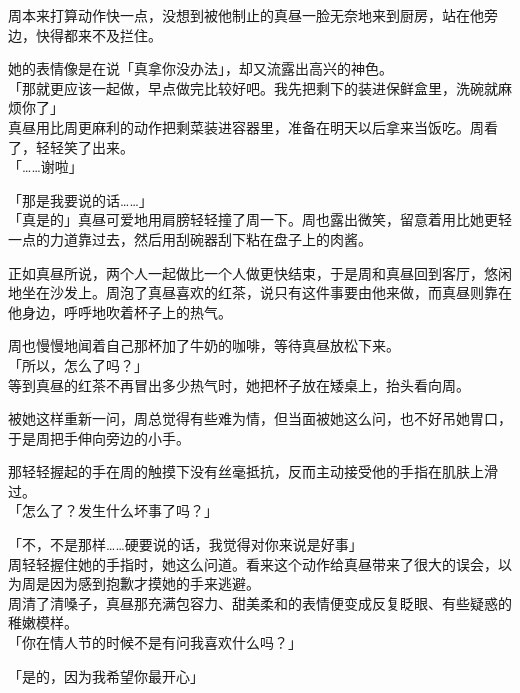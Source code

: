 周本来打算动作快一点，没想到被他制止的真昼一脸无奈地来到厨房，站在他旁边，快得都来不及拦住。

她的表情像是在说「真拿你没办法」，却又流露出高兴的神色。\\

「那就更应该一起做，早点做完比较好吧。我先把剩下的装进保鲜盒里，洗碗就麻烦你了」\\

真昼用比周更麻利的动作把剩菜装进容器里，准备在明天以后拿来当饭吃。周看了，轻轻笑了出来。\\

「……谢啦」

「那是我要说的话……」\\

「真是的」真昼可爱地用肩膀轻轻撞了周一下。周也露出微笑，留意着用比她更轻一点的力道靠过去，然后用刮碗器刮下粘在盘子上的肉酱。\\

\vspace{2\baselineskip}

正如真昼所说，两个人一起做比一个人做更快结束，于是周和真昼回到客厅，悠闲地坐在沙发上。周泡了真昼喜欢的红茶，说只有这件事要由他来做，而真昼则靠在他身边，呼呼地吹着杯子上的热气。

周也慢慢地闻着自己那杯加了牛奶的咖啡，等待真昼放松下来。\\

「所以，怎么了吗？」\\

等到真昼的红茶不再冒出多少热气时，她把杯子放在矮桌上，抬头看向周。

被她这样重新一问，周总觉得有些难为情，但当面被她这么问，也不好吊她胃口，于是周把手伸向旁边的小手。

那轻轻握起的手在周的触摸下没有丝毫抵抗，反而主动接受他的手指在肌肤上滑过。\\

「怎么了？发生什么坏事了吗？」

「不，不是那样……硬要说的话，我觉得对你来说是好事」\\

周轻轻握住她的手指时，她这么问道。看来这个动作给真昼带来了很大的误会，以为周是因为感到抱歉才摸她的手来逃避。\\

周清了清嗓子，真昼那充满包容力、甜美柔和的表情便变成反复眨眼、有些疑惑的稚嫩模样。\\

「你在情人节的时候不是有问我喜欢什么吗？」

「是的，因为我希望你最开心」

